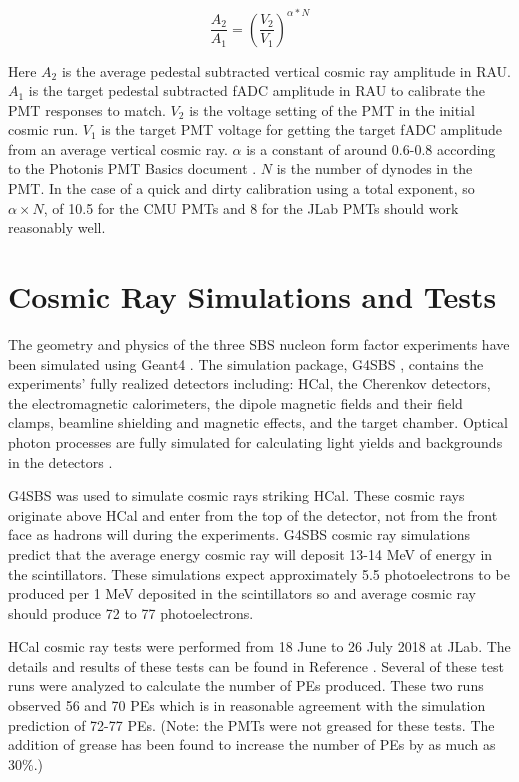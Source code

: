 \documentclass[10pt]{article}
\begin{document}
	\begin{equation}
		\frac{A_2}{A_1} = \left( \frac{V_2}{V_1} \right)^{\alpha * N}
	\end{equation}
	\label{eq:hv_calibration}
	
\noindent Here $A_2$ is the average pedestal subtracted vertical cosmic ray amplitude in RAU. $A_1$ is the target pedestal subtracted fADC amplitude in RAU to calibrate the PMT responses to match. $V_2$ is the voltage setting of the PMT in the initial cosmic run. $V_1$ is the target PMT voltage for getting the target fADC amplitude from an average vertical cosmic ray. $\alpha$ is a constant of around 0.6-0.8 according to the Photonis PMT Basics document \cite{pmt_basics}. $N$ is the number of dynodes in the PMT. In the case of a quick and dirty calibration using a total exponent, so $\alpha \times N$, of 10.5 for the CMU PMTs and 8 for the JLab PMTs should work reasonably well. 

\section{Cosmic Ray Simulations and Tests}
\label{cosmics}
The geometry and physics of the three SBS nucleon form factor experiments have been simulated using Geant4 \cite{AGOSTINELLI2003250}. The simulation package, G4SBS \cite{g4sbs}, contains the experiments' fully realized detectors including: HCal, the Cherenkov detectors, the electromagnetic calorimeters, the dipole magnetic fields and their field clamps, beamline shielding and magnetic effects, and the target chamber. Optical photon processes are fully simulated for calculating light yields and backgrounds in the detectors \cite{halla_2014}.

G4SBS was used to simulate cosmic rays striking HCal. These cosmic rays originate above HCal and enter from the top of the detector, not from the front face as hadrons will during the experiments. G4SBS cosmic ray simulations predict that the average energy cosmic ray will deposit 13-14 MeV of energy in the scintillators. These simulations expect approximately 5.5 photoelectrons to be produced per 1 MeV deposited in the scintillators so and average cosmic ray should produce 72 to 77 photoelectrons. 

HCal cosmic ray tests were performed from 18 June to 26 July 2018 at JLab. The details and results of these tests can be found in Reference \cite{cosmics2018}. Several of these test runs were analyzed to calculate the number of PEs produced. These two runs observed 56 and 70 PEs which is in reasonable agreement with the simulation prediction of 72-77 PEs. (Note: the PMTs were not greased for these tests. The addition of grease has been found to increase the number of PEs by as much as 30\%.)


\end{document}
